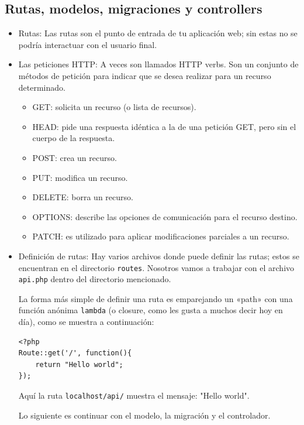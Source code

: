\documentclass[11pt]{article}
\begin{document}
\subsection{Rutas, modelos, migraciones y controllers}
\label{sec:orgf77c039}
\begin{itemize}
\item Rutas:
\label{sec:org11dd9df}
Las rutas son el punto de entrada de tu aplicación web; sin estas no
se podría interactuar con el usuario final.

\item Las peticiones HTTP:
\label{sec:org4997572}
A veces son llamados HTTP verbs. Son un conjunto de métodos de
petición para indicar que se desea realizar para un recurso
determinado.
\begin{itemize}
\item GET: solicita un recurso (o lista de recursos).
\item HEAD: pide una respuesta idéntica a la de una petición GET, pero
sin el cuerpo de la respuesta.
\item POST: crea un recurso.
\item PUT: modifica un recurso.
\item DELETE: borra un recurso.
\item OPTIONS: describe las opciones de comunicación para el recurso destino.
\item PATCH: es utilizado para aplicar modificaciones parciales a un recurso.
\end{itemize}

\item Definición de rutas:
\label{sec:org0b7ff96}
Hay varios archivos donde puede definir las rutas; estos se encuentran
en el directorio \texttt{routes}. Nosotros vamos a trabajar con el archivo
\texttt{api.php} dentro del directorio mencionado.

La forma más simple de definir una ruta es emparejando un «path» con
una función anónima \texttt{lambda} (o closure, como les gusta a muchos decir
hoy en día), como se muestra a continuación:
\begin{verbatim}
<?php
Route::get('/', function(){
    return "Hello world";
});
\end{verbatim}

Aquí la ruta \texttt{localhost/api/} muestra el mensaje: "Hello world".

Lo siguiente es continuar con el modelo, la migración y el controlador.
\end{itemize}
\end{document}
